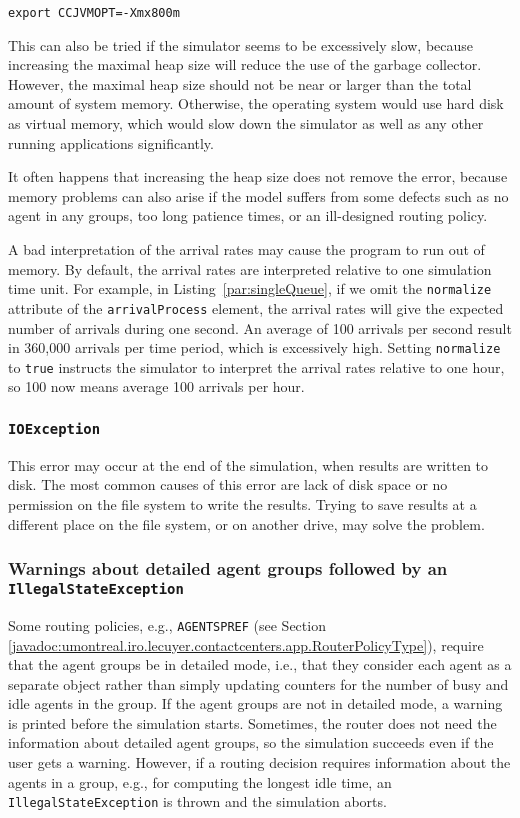 \noindent\texttt{export CCJVMOPT=-Xmx800m}

This can also be tried if the simulator
seems to be excessively slow, because increasing the maximal heap size
will reduce the use of the garbage collector.
However, the maximal heap size should not be near or larger than
the total amount
of system memory.  Otherwise, the operating system would use hard disk
as virtual memory, which would slow down the simulator as well as any
other running applications significantly.

It often happens that increasing the heap size does not remove
the error, because
memory problems can also arise if the model suffers from some defects
such as no agent in any groups, too long patience times,
or an ill-designed routing policy.

A bad interpretation of the arrival rates may cause the program to run
out of memory.
By default, the arrival rates are interpreted relative to one
simulation time unit.
For example, in Listing~\ref{par:singleQueue},
if we omit the \texttt{normalize} attribute of the
\texttt{arrival\-Process} element,
the arrival rates will give the expected number of arrivals during one
second.
An average of 100 arrivals per second result in 360,000 arrivals per
time period, which is excessively high.
Setting \texttt{normalize} to \texttt{true} instructs the simulator to
interpret the arrival rates relative to one hour, so 100 now means
average 100
arrivals per hour.

\subsubsection{\texttt{IOException}}

This error may occur at the end of the simulation, when results are
written to disk.
The most common causes of this error are lack of disk space or no
permission on the file system to write the results.
Trying to save results at a different place on the file system, or on
another drive, may solve the problem.

\subsubsection{Warnings about detailed agent groups followed by an
  \texttt{Illegal\-State\-Exception}}

Some routing policies, e.g., \texttt{AGENTSPREF}
(see Section
\ref{javadoc:umontreal.iro.lecuyer.contactcenters.app.RouterPolicyType}),
require that the
agent groups be in detailed mode, i.e., that they consider each agent
as a separate object rather than simply updating counters for the
number of busy and idle agents in the group.
If the agent groups are not in detailed mode, a warning is printed
before the simulation starts.
Sometimes, the router does not need the information about detailed
agent groups, so the simulation succeeds even if the user gets a
warning.
However, if a routing decision requires information about the agents
in a group, e.g., for computing the longest idle time, an
\texttt{Illegal\-State\-Exception} is thrown and the simulation
aborts.

